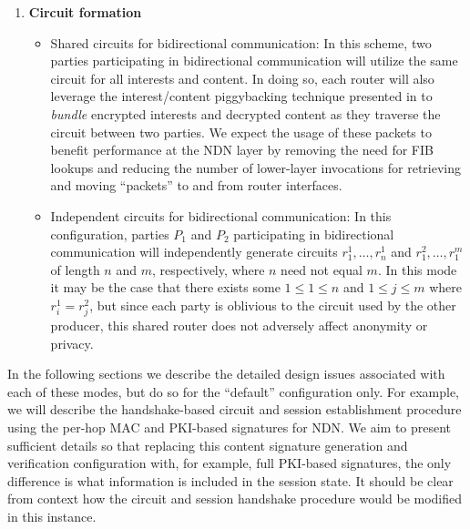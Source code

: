 \documentclass[10pt]{article}
\begin{document}
\begin{enumerate}
\item \textbf{Circuit formation}
\begin{itemize}
  \item Shared circuits for bidirectional communication: In this scheme, two parties participating in bidirectional communication will utilize the same circuit for all interests and content. In doing so, each router will also leverage the interest/content piggybacking technique presented in \cite{piggyback} to \emph{bundle} encrypted interests and decrypted content as they traverse the circuit between two parties. We expect the usage of these packets to benefit performance at the NDN layer by removing the need for FIB lookups and reducing the number of lower-layer invocations for retrieving and moving ``packets'' to and from router interfaces. 

  \item Independent circuits for bidirectional communication: In this configuration, parties $P_1$ and $P_2$ participating in bidirectional communication will independently generate circuits $r_1^1,\dots,r_n^1$ and $r_1^2,\dots,r_1^m$ of length $n$ and $m$, respectively, where $n$ need not equal $m$. In this mode it may be the case that there exists some $1 \leq 1 \leq n$ and $1 \leq j \leq m$ where $r_i^1 = r_j^2$, but since each party is oblivious to the circuit used by the other producer, this shared router does not adversely affect anonymity or privacy.
\end{itemize}

\end{enumerate}

In the following sections we describe the detailed design issues associated with each of these modes, but do so for the ``default'' configuration only. For example, we will describe the handshake-based circuit and session establishment procedure using the per-hop MAC and PKI-based signatures for NDN. We aim to present sufficient details so that replacing this content signature generation and verification configuration with, for example, full PKI-based signatures, the only difference is what information is included in the session state. It should be clear from context how the circuit and session handshake procedure would be modified in this instance.

\end{document}
